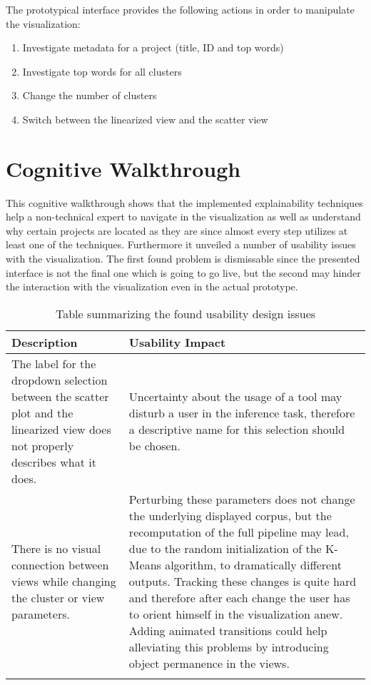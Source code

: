The prototypical interface provides the following actions in order to manipulate the visualization:
\begin{enumerate}
	\item Investigate metadata for a project (title, ID and top words)
	\item Investigate top words for all clusters
	\item Change the number of clusters
	\item Switch between the linearized view and the scatter view
\end{enumerate}



\section{Cognitive Walkthrough} 

This cognitive walkthrough shows that the implemented explainability techniques help a non-technical expert to navigate in the visualization as well as understand why certain projects are located as they are since almost every step utilizes at least one of the techniques. Furthermore it unveiled a number of usability issues with the visualization. The first found problem is dismissable since the presented interface is not the final one which is going to go live, but the second may hinder the interaction with the visualization even in the actual prototype.

\newpage

\begin{longtable}[l]{| p{} | p{}  |} 
	\hline
	Description & Usability Impact \\ \hline \hline
	The label for the dropdown selection between the scatter plot and the linearized view does not properly describes what it does. & 
	Uncertainty about the usage of a tool may disturb a user in the inference task, therefore a descriptive name for this selection should be chosen. \\ \hline
	There is no visual connection between views while changing the cluster or view parameters. &
	Perturbing these parameters does not change the underlying displayed corpus, but the recomputation of the full pipeline may lead, due to the random initialization of the K-Means algorithm, to dramatically different outputs. Tracking these changes is quite hard and therefore after each change the user has to orient himself in the visualization anew. Adding animated transitions could help alleviating this problems by introducing object permanence in the views. \\ \hline
	
	
	\caption{Table summarizing the found usability design issues} 
	\label{tab:usability_problems}
\end{longtable}

